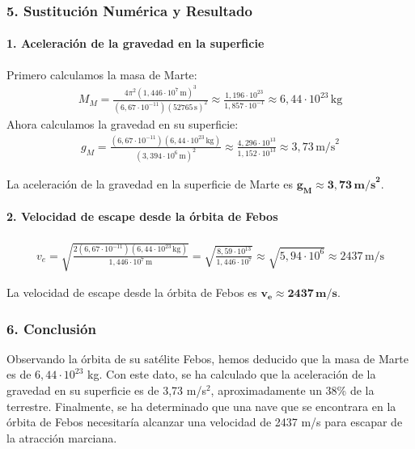 \subsubsection*{5. Sustitución Numérica y Resultado}
\paragraph{1. Aceleración de la gravedad en la superficie}
Primero calculamos la masa de Marte:
\begin{gather}
    M_M = \frac{4\pi^2 (1,446 \cdot 10^7\,\text{m})^3}{(6,67 \cdot 10^{-11})(52765\,\text{s})^2} \approx \frac{1,196 \cdot 10^{23}}{1,857 \cdot 10^{-1}} \approx 6,44 \cdot 10^{23}\,\text{kg}
\end{gather}
Ahora calculamos la gravedad en su superficie:
\begin{gather}
    g_M = \frac{(6,67 \cdot 10^{-11})(6,44 \cdot 10^{23}\,\text{kg})}{(3,394 \cdot 10^6\,\text{m})^2} \approx \frac{4,296 \cdot 10^{13}}{1,152 \cdot 10^{13}} \approx 3,73\,\text{m/s}^2
\end{gather}
\begin{cajaresultado}
La aceleración de la gravedad en la superficie de Marte es $\boldsymbol{g_M \approx 3,73\,\textbf{m/s}^2}$.
\end{cajaresultado}

\paragraph{2. Velocidad de escape desde la órbita de Febos}
\begin{gather}
    v_e = \sqrt{\frac{2(6,67 \cdot 10^{-11})(6,44 \cdot 10^{23}\,\text{kg})}{1,446 \cdot 10^7\,\text{m}}} = \sqrt{\frac{8,59 \cdot 10^{13}}{1,446 \cdot 10^7}} \approx \sqrt{5,94 \cdot 10^6} \approx 2437\,\text{m/s}
\end{gather}
\begin{cajaresultado}
La velocidad de escape desde la órbita de Febos es $\boldsymbol{v_e \approx 2437\,\textbf{m/s}}$.
\end{cajaresultado}

\subsubsection*{6. Conclusión}
\begin{cajaconclusion}
Observando la órbita de su satélite Febos, hemos deducido que la masa de Marte es de $6,44 \cdot 10^{23}$ kg. Con este dato, se ha calculado que la aceleración de la gravedad en su superficie es de 3,73 m/s$^2$, aproximadamente un 38\% de la terrestre. Finalmente, se ha determinado que una nave que se encontrara en la órbita de Febos necesitaría alcanzar una velocidad de 2437 m/s para escapar de la atracción marciana.
\end{cajaconclusion}

